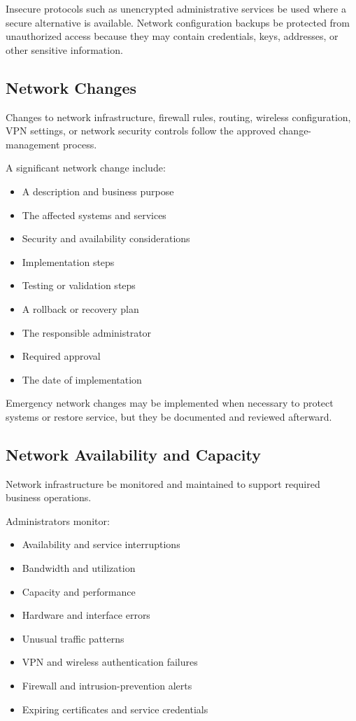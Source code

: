 Insecure protocols such as unencrypted administrative services \mustnot{} be used where a secure alternative is available. Network configuration backups \must{} be protected from unauthorized access because they may contain credentials, keys, addresses, or other sensitive information.

\subsection{Network Changes}

Changes to network infrastructure, firewall rules, routing, wireless configuration, VPN settings, or network security controls \must{} follow the approved change-management process.

A significant network change \must{} include:
\begin{itemize}
    \item A description and business purpose
    \item The affected systems and services
    \item Security and availability considerations
    \item Implementation steps
    \item Testing or validation steps
    \item A rollback or recovery plan
    \item The responsible administrator
    \item Required approval
    \item The date of implementation
\end{itemize}

Emergency network changes may be implemented when necessary to protect systems or restore service, but they \must{} be documented and reviewed afterward.

\subsection{Network Availability and Capacity}

Network infrastructure \must{} be monitored and maintained to support required business operations.

Administrators \should{} monitor:
\begin{itemize}
    \item Availability and service interruptions
    \item Bandwidth and utilization
    \item Capacity and performance
    \item Hardware and interface errors
    \item Unusual traffic patterns
    \item VPN and wireless authentication failures
    \item Firewall and intrusion-prevention alerts
    \item Expiring certificates and service credentials
\end{itemize}

